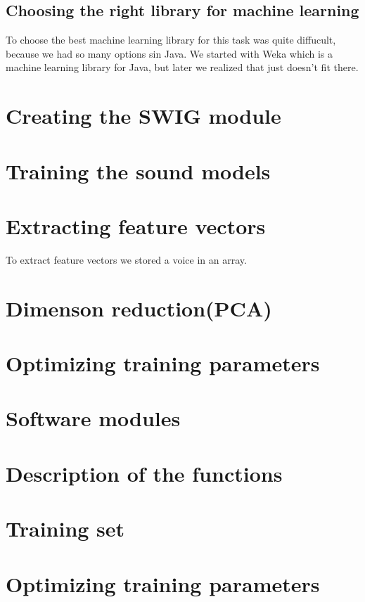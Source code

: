 \documentclass[english,12pt,oneside,a4paper]{article}
\begin{document}
\begin{center}
		\subsection{Choosing the right library for machine learning}
		To choose the best machine learning library for this task was quite diffucult, because we had so many options sin Java. We started with Weka which is a machine learning library for Java, but later we realized that just doesn't fit there.
		\section{Creating the SWIG module}
		
		\section{Training the sound models}
		
		\section{Extracting feature vectors}
		To extract feature vectors we stored a voice in an array.
		\section{Dimenson reduction(PCA)}
		
		\section{Optimizing training parameters}
		
		\section{Software modules}
		
		\section{Description of the functions}
		
		\section{Training set}
		
		\section{Optimizing training parameters}
		

\end{center}
\end{document}
